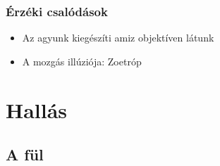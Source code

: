 \documentclass{article}
\begin{document}
\subsubsection{Érzéki csalódások}
\begin{itemize}
    \item Az agyunk kiegészíti amiz objektíven látunk
    \item A mozgás illúziója: Zoetróp
\end{itemize}

\section{Hallás}
\subsection{A fül}

\end{document}
